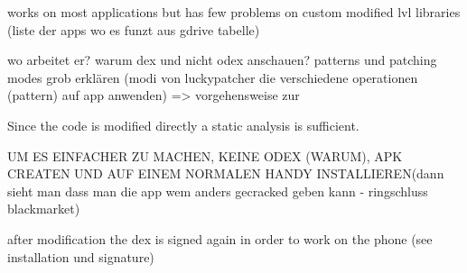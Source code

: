 works on most applications but has few problems on custom modified lvl libraries (liste der apps wo es funzt aus gdrive tabelle)

\cite{munteanLicense}
%

wo arbeitet er?\newline
warum dex und nicht odex anschauen?\newline
patterns und patching modes grob erklären (modi von luckypatcher die verschiedene operationen (pattern) auf app anwenden) => vorgehensweise zur\newline

Since the code is modified directly a static analysis is sufficient.\newline

UM ES EINFACHER ZU MACHEN, KEINE ODEX (WARUM), APK CREATEN UND AUF EINEM NORMALEN HANDY INSTALLIEREN(dann sieht man dass man die app wem anders gecracked geben kann - ringschluss blackmarket)\newline

after modification the dex is signed again in order to work on the phone (see installation und signature)
